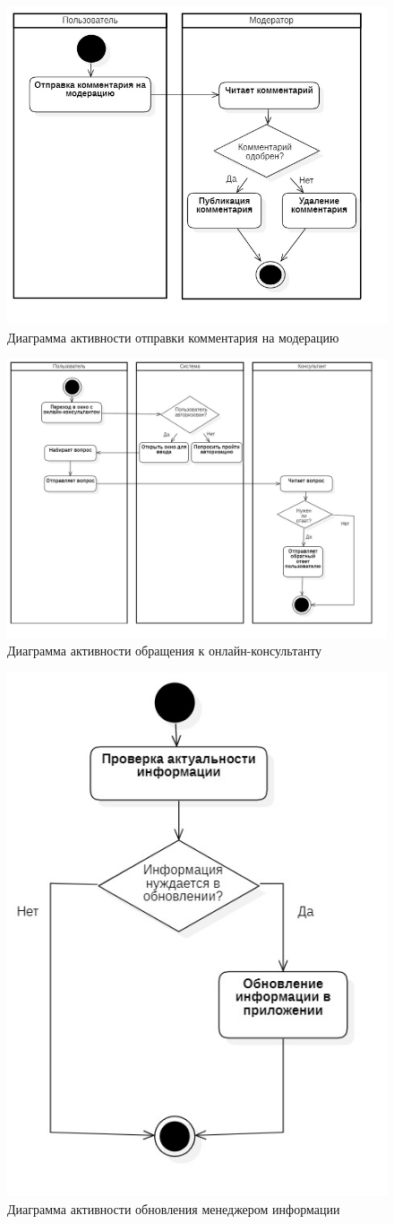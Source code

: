 \documentclass[14pt]{extreport}
\begin{document}
\begin{figure}[H]
\centerline{\includegraphics[width=0.7\linewidth]{act_kom}}
\caption{Диаграмма активности отправки комментария на модерацию}
\label{fig6}
\end{figure}

\begin{figure}[H]
\centerline{\includegraphics[width=1\linewidth]{act_kons}}
\caption{Диаграмма активности обращения к онлайн-консультанту}
\label{fig7}
\end{figure}

\begin{figure}[H]
\centerline{\includegraphics[width=0.5\linewidth]{act_men}}
\caption{Диаграмма активности обновления менеджером информации}
\label{fig8}
\end{figure}
\end{document}
